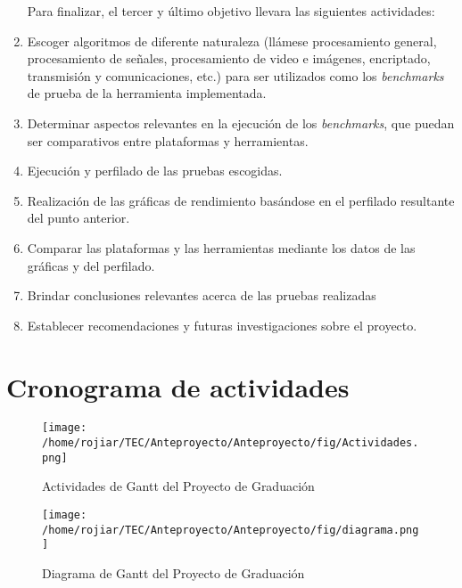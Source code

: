 \begin{enumerate}
 Para finalizar, el tercer y último objetivo llevara las siguientes actividades: \\
 
 \item Escoger algoritmos de diferente naturaleza (llámese procesamiento general, procesamiento de señales, 
 procesamiento de video e imágenes, encriptado, transmisión y comunicaciones, etc.) para ser utilizados como los
 \textit{benchmarks} de prueba de la herramienta implementada.
 \item Determinar aspectos relevantes en la ejecución de los \textit{benchmarks}, que puedan ser comparativos entre
 plataformas y herramientas.
 \item Ejecución y perfilado de las pruebas escogidas.
 \item Realización de las gráficas de rendimiento basándose en el perfilado resultante del punto anterior.
 \item Comparar las plataformas y las herramientas mediante los datos de las gráficas y del perfilado.
 \item Brindar conclusiones relevantes acerca de las pruebas realizadas
 \item Establecer recomendaciones y futuras investigaciones sobre el proyecto.
 
\end{enumerate}

\newpage
\section{Cronograma de actividades}

\begin{figure}[htb]
\centering
  \texttt{[image: /home/rojiar/TEC/Anteproyecto/Anteproyecto/fig/Actividades.png]}
  \caption{Actividades de Gantt del Proyecto de Graduación}
  \label{fig:Actividades de Gantt}
\end{figure}

\newpage

\begin{figure}[htb]
  \centering
  \texttt{[image: /home/rojiar/TEC/Anteproyecto/Anteproyecto/fig/diagrama.png]}
  \caption{Diagrama de Gantt del Proyecto de Graduación}
  \label{fig:Diagrama de Gantt}
\end{figure}






